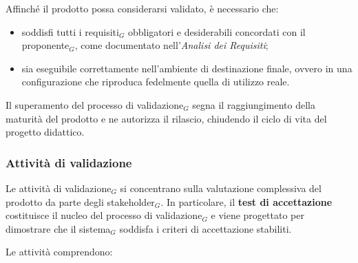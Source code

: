 \documentclass[a4paper, 10pt]{article}
\begin{document}
Affinché il prodotto possa considerarsi validato, è necessario che:
\begin{itemize}
    \item soddisfi tutti i requisiti$_G$ obbligatori e desiderabili concordati con il proponente$_G$, come documentato nell'\emph{Analisi dei Requisiti};
    \item sia eseguibile correttamente nell'ambiente di destinazione finale, ovvero in una configurazione che riproduca fedelmente quella di utilizzo reale.
\end{itemize}

Il superamento del processo di validazione$_G$ segna il raggiungimento della maturità del prodotto e ne autorizza il rilascio, chiudendo il ciclo di vita del progetto didattico.

\subsubsection{Attività di validazione}
\label{subsec:attivita_validazione}

Le attività di validazione$_G$ si concentrano sulla valutazione complessiva del prodotto da parte degli stakeholder$_G$. In particolare, il \textbf{test di accettazione} costituisce il nucleo del processo di validazione$_G$ e viene progettato per dimostrare che il sistema$_G$ soddisfa i criteri di accettazione stabiliti.

Le attività comprendono:
\end{document}
